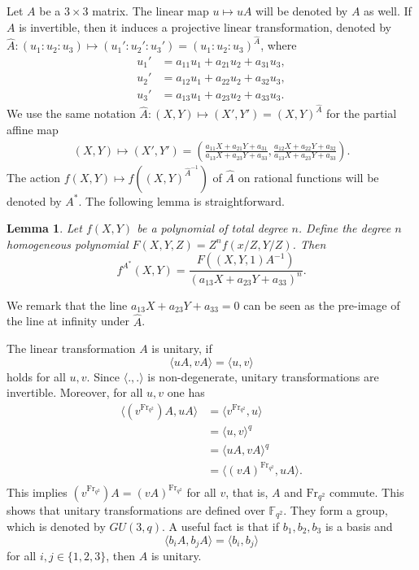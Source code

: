 \documentclass[11pt]{amsart}
\theoremstyle{plain}
\newtheorem{lemma}[theorem]{Lemma}
\theoremstyle{definition}
\theoremstyle{remark}
\newcommand{\Frob}{{\mathrm{Fr}_{q^2}}}
\begin{document}
Let $A$ be a $3\times 3$ matrix. The linear map $u\mapsto uA$ will be denoted by $A$ as well. If $A$ is invertible, then it induces a projective linear transformation, denoted by $\hat{A}:(u_1:u_2:u_3)\mapsto (u_1':u_2':u_3')=(u_1:u_2:u_3)^{\hat{A}}$, where
\begin{align*} %
u_1' &= a_{11}u_1+a_{21}u_2+a_{31}u_3, \\
u_2' &= a_{12}u_1+a_{22}u_2+a_{32}u_3, \\
u_3' &= a_{13}u_1+a_{23}u_2+a_{33}u_3. 
\end{align*}
We use the same notation $\hat{A}:(X,Y) \mapsto (X',Y')=(X,Y)^{\hat{A}}$ for the partial affine map
\begin{align*} %
(X,Y) \mapsto (X',Y') = \left(\frac{a_{11}X+a_{21}Y+a_{31}}{a_{13}X+a_{23}Y+a_{33}}, \frac{a_{12}X+a_{22}Y+a_{32}}{a_{13}X+a_{23}Y+a_{33}}\right).
\end{align*}
The action $f(X,Y) \mapsto f((X,Y)^{\hat{A}^{-1}})$ of $\hat{A}$ on rational functions will be denoted by $A^*$. The following lemma is straightforward.
\begin{lemma} \label{lm:f-action}
Let $f(X,Y)$ be a polynomial of total degree $n$. Define the degree $n$ homogeneous polynomial $F(X,Y,Z)=Z^n f(x/Z,Y/Z)$. Then
\[f^{A^*}(X,Y)=\frac{F((X,Y,1)A^{-1})}{(a_{13}X+a_{23}Y+a_{33})^n}.\]
\end{lemma}
We remark that the line $a_{13}X+a_{23}Y+a_{33}=0$ can be seen as the pre-image of the line at infinity under $\hat{A}$. 

The linear transformation $A$ is unitary, if
\[\langle uA, vA \rangle = \langle u,v \rangle\]
holds for all $u,v$. Since $\langle .,. \rangle$ is non-degenerate, unitary transformations are invertible. Moreover, for all $u,v$ one has
\begin{align*}
\langle (v^\Frob)A, uA \rangle &= \langle v^\Frob,u \rangle \\
&= \langle u,v \rangle^q \\
&= \langle uA,vA \rangle^q \\
&= \langle (vA)^\Frob,uA \rangle. \\
\end{align*}
This implies $(v^\Frob)A = (vA)^\Frob$ for all $v$, that is, $A$ and $\Frob$ commute. This shows that unitary transformations are defined over $\mathbb{F}_{q^2}$. They form a group, which is denoted by $GU(3,q)$. A useful fact is that if $b_1,b_2,b_3$ is a basis and
\[\langle b_iA, b_jA \rangle = \langle b_i,b_j \rangle\]
for all $i,j\in \{1,2,3\}$, then $A$ is unitary. 
\end{document}
